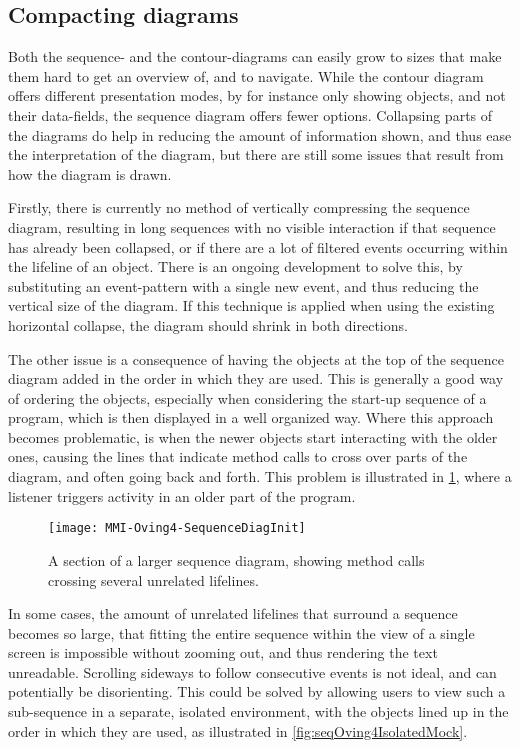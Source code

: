 \subsection{Compacting diagrams}\label{jiveSuggestionsCompact}
Both the sequence- and the contour-diagrams can easily grow to sizes that make them hard to get an overview of, and to navigate.
While the contour diagram offers different presentation modes, by for instance only showing objects, and not their data-fields, the sequence diagram offers fewer options.
Collapsing parts of the diagrams do help in reducing the amount of information shown, and thus ease the interpretation of the diagram, but there are still some issues that result from how the diagram is drawn.

Firstly, there is currently no method of vertically compressing the sequence diagram, resulting in long sequences with no visible interaction if that sequence has already been collapsed, or if there are a lot of filtered events occurring within the lifeline of an object.
There is an ongoing development to solve this, by substituting an event-pattern with a single new event, and thus reducing the vertical size of the diagram.
If this technique is applied when using the existing horizontal collapse, the diagram should shrink in both directions.

The other issue is a consequence of having the objects at the top of the sequence diagram added in the order in which they are used.
This is generally a good way of ordering the objects, especially when considering the start-up sequence of a program, which is then displayed in a well organized way.
Where this approach becomes problematic, is when the newer objects start interacting with the older ones, causing the lines that indicate method calls to cross over parts of the diagram, and often going back and forth.
This problem is illustrated in \cref{fig:seqOving4CrossLines}, where a listener triggers activity in an older part of the program.

\begin{figure}[H]
	\centering
	\texttt{[image: MMI-Oving4-SequenceDiagInit]}
	\caption{A section of a larger sequence diagram, showing method calls crossing several unrelated lifelines.}
	\label{fig:seqOving4CrossLines}
\end{figure}

In some cases, the amount of unrelated lifelines that surround a sequence becomes so large, that fitting the entire sequence within the view of a single screen is impossible without zooming out, and thus rendering the text unreadable.
Scrolling sideways to follow consecutive events is not ideal, and can potentially be disorienting.
This could be solved by allowing users to view such a sub-sequence in a separate, isolated environment, with the objects lined up in the order in which they are used, as illustrated in \cref{fig:seqOving4IsolatedMock}.

